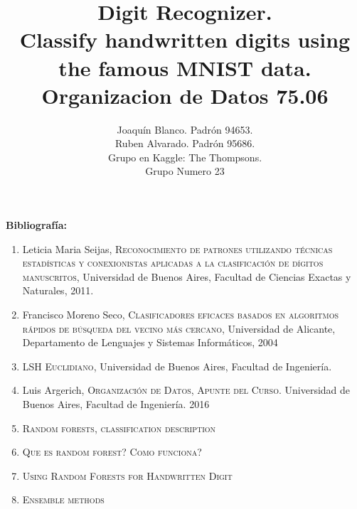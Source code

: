 \documentclass[a4paper,11pt]{report}
\title{Digit Recognizer. \\ 
  Classify handwritten digits using the famous MNIST data.\\
  Organizacion de Datos 75.06}
\author{Joaquín Blanco. Padrón 94653.\\
  Ruben Alvarado. Padrón 95686.\\
  Grupo en Kaggle: The Thompsons.\\
  Grupo Numero 23}
\begin{document}
\maketitle
\tableofcontents






\textbf{Bibliografía:}
\begin{enumerate}
  \item Leticia Maria Seijas, \textsc{Reconocimiento de patrones utilizando técnicas estadísticas y conexionistas aplicadas a la clasificación de dígitos manuscritos}, Universidad de Buenos Aires, Facultad de Ciencias Exactas y Naturales, 2011.
  \item Francisco Moreno Seco, \textsc{Clasificadores eficaces basados en algoritmos rápidos de búsqueda del vecino más cercano}, Universidad de Alicante, Departamento de Lenguajes y Sistemas Informáticos, 2004
  \item \textsc{LSH Euclidiano}, Universidad de Buenos Aires, Facultad de Ingeniería.
  \item Luis Argerich, \textsc{Organización de Datos, Apunte del Curso.} Universidad de Buenos Aires, Facultad de Ingeniería. 2016
  \item \textsc{Random forests, classification description} 
  \item \textsc{Que es random forest? Como funciona?}
  \item \textsc{Using Random Forests for Handwritten Digit}
  \item \textsc{Ensemble methods  }
\end{enumerate}
\end{document}
